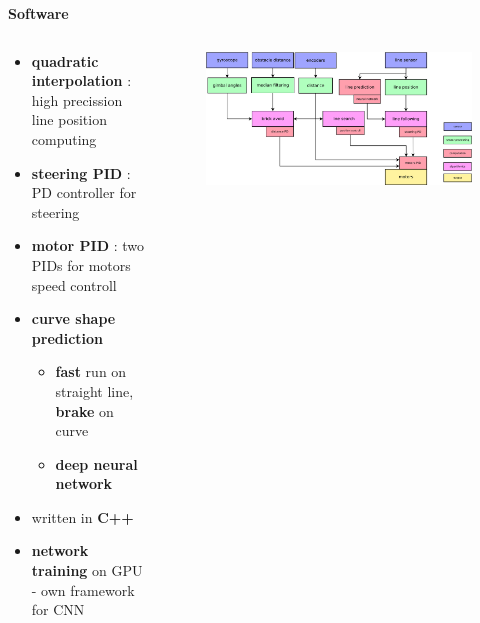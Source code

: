 \documentclass[xcolor=dvipsnames]{beamer}
\begin{document}
\begin{frame}{\bf Software}



\begin{columns}

    \begin{column}{0.5\textwidth}  %
    {\small
        \begin{itemize}
            \item {\bf quadratic interpolation}  : high precission line position computing
            \item {\bf steering PID}  : PD controller for steering
            \item {\bf motor PID}  : two PIDs for motors speed controll
            \item {\bf curve shape prediction}
                \begin{itemize}
                    \item {\bf fast} run on straight line, {\bf brake} on curve
                    \item {\color{red} \bf deep neural network}
                \end{itemize}
            \item written in {\bf C++}
            \item {\bf network training} on GPU - own framework for CNN
        \end{itemize}
    }
    \end{column}

    \begin{column}{0.5\textwidth}

        \begin{figure}
            \includegraphics[scale=0.1]{../../diagrams/motoko_suftware_blocks.png}
        \end{figure}

    \end{column}




\end{columns}

\end{frame}
\end{document}
